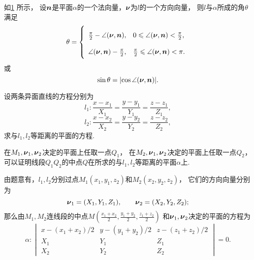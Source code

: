 如\cref{figure:解析几何.直线与平面的夹角} 所示，
设\(\boldsymbol{n}\)是平面\(\alpha\)的一个法向量，\(\boldsymbol{\nu}\)为\(l\)的一个方向向量，
则\(l\)与\(\alpha\)所成的角\(\theta\)满足\[
	\theta = \left\{ \def\arraystretch{2} \begin{array}{ll}
		\frac{\pi}{2} - \angle(\mat{\nu},\mat{n}),
			& 0 \leqslant \angle(\mat{\nu},\mat{n}) < \frac{\pi}{2}, \\
		\angle(\mat{\nu},\mat{n}) - \frac{\pi}{2},
			& \frac{\pi}{2} \leqslant \angle(\mat{\nu},\mat{n}) < \pi.
	\end{array} \right.
\]
或\[
	\sin\theta = \abs{\cos\angle(\boldsymbol{\nu},\boldsymbol{n})}.
\]

\begin{figure}[hb]
	\centering
	\caption{}
	\label{figure:解析几何.直线与平面的夹角}
\end{figure}

\begin{example}
设两条异面直线的方程分别为\[
	l_1: \frac{x-x_1}{X_1} = \frac{y-y_1}{Y_1} = \frac{z-z_1}{Z_1},
\]\[
	l_2: \frac{x-x_2}{X_2} = \frac{y-y_2}{Y_2} = \frac{z-z_2}{Z_2},
\]
求与\(l_1,l_2\)等距离的平面的方程.
\begin{solution}
在\(M_1,\boldsymbol{\nu}_1,\boldsymbol{\nu}_2\)决定的平面上任取一点\(Q_1\)，
在\(M_2,\boldsymbol{\nu}_1,\boldsymbol{\nu}_2\)决定的平面上任取一点\(Q_2\)，
可以证明线段\(Q_1 Q_2\)的中点\(Q\)在所求的与\(l_1,l_2\)等距离的平面\(\alpha\)上.

由题意有，\(l_1,l_2\)分别过点\(M_1(x_1,y_1,z_2)\)和\(M_2(x_2,y_2,z_2)\)，
它们的方向向量分别为\[
	\boldsymbol{\nu}_1 = (X_1,Y_1,Z_1), \qquad
	\boldsymbol{\nu}_2 = (X_2,Y_2,Z_2);
\]
那么由\(M_1,M_2\)连线段的中点\(M\left(
	\frac{x_1+x_2}{2},
	\frac{y_1+y_2}{2},
	\frac{z_1+z_2}{2}
\right)\)
和\(\boldsymbol{\nu}_1,\boldsymbol{\nu}_2\)决定的平面的方程为\[
	\alpha: \begin{vmatrix}
		x - (x_1+x_2)/2 & y - (y_1+y_2)/2 & z - (z_1+z_2)/2 \\
		X_1 & Y_1 & Z_1 \\
		X_2 & Y_2 & Z_2
	\end{vmatrix} = 0.
\]
\end{solution}
\end{example}

